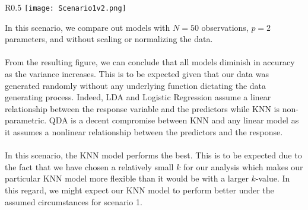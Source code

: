 \documentclass[11pt, oneside]{article}
\begin{document}
\begin{wrapfigure}[]{R}{0.5\textwidth}
\vspace{-0.55cm}
\texttt{[image: Scenario1v2.png]}
\vspace{-.55cm}
\end{wrapfigure}
In this scenario, we compare out models with $N=50$ observations, $p=2$ parameters, and without scaling or normalizing the data.\\
\\
From the resulting figure, we can conclude that all models diminish in accuracy as the variance increases. This is to be expected given that our data was generated randomly without any underlying function dictating the data generating process. Indeed, LDA and Logistic Regression assume a linear relationship between the response variable and the predictors while KNN is non-parametric. QDA is a decent compromise between KNN and any linear model as it assumes a nonlinear relationship between the predictors and the response.\\
\\
In this scenario, the KNN model performs the best. This is to be expected due to the fact that we have chosen a relatively small $k$ for our analysis which makes our particular KNN model more flexible than it would be with a larger $k$-value. In this regard, we might expect our KNN model to perform better under the assumed circumstances for scenario 1.
\end{document}

